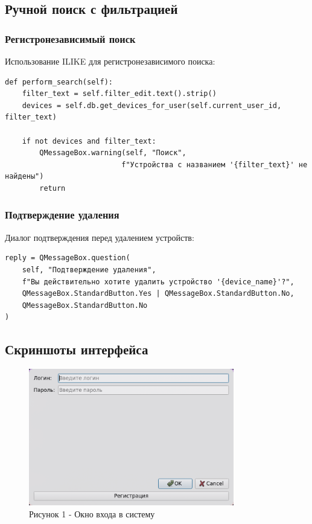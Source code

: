 \documentclass[oneside,a4paper,14pt]{extarticle}
\begin{document}
\subsection*{Ручной поиск с фильтрацией}

\subsubsection*{Регистронезависимый поиск}
Использование ILIKE для регистронезависимого поиска:

\begin{verbatim}
def perform_search(self):
    filter_text = self.filter_edit.text().strip()
    devices = self.db.get_devices_for_user(self.current_user_id, filter_text)

    if not devices and filter_text:
        QMessageBox.warning(self, "Поиск",
                           f"Устройства с названием '{filter_text}' не найдены")
        return
\end{verbatim}

\subsubsection*{Подтверждение удаления}
Диалог подтверждения перед удалением устройств:

\begin{verbatim}
reply = QMessageBox.question(
    self, "Подтверждение удаления",
    f"Вы действительно хотите удалить устройство '{device_name}'?",
    QMessageBox.StandardButton.Yes | QMessageBox.StandardButton.No,
    QMessageBox.StandardButton.No
)
\end{verbatim}

\subsection*{Скриншоты интерфейса}

\begin{figure}[H]
  \centering
  \includegraphics[width=0.8\textwidth]{pics/login.png}
  \caption{Рисунок 1 - Окно входа в систему}
\end{figure}
\end{document}
